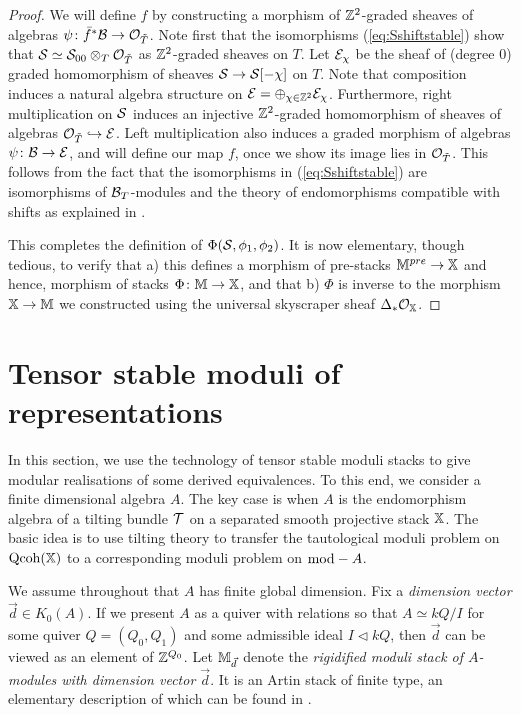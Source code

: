\documentclass[12pt]{amsart}
\begin{document}
\begin{proof}
We will define $f$ by constructing a morphism of $\mathbb{Z}^2$-graded sheaves of algebras $\psi \colon \bar{f}^* \mathcal{B} \to \mathcal{O}_{\tilde{T}}$. Note first that the isomorphisms (\ref{eq:Sshiftstable}) show that 
$\mathcal{S} \simeq \mathcal{S}_{00} \otimes_T \mathcal{O}_{\tilde{T}}$ as $\mathbb{Z}^2$-graded sheaves on $T$. Let $\mathcal{E}_{\chi}$ be the sheaf of (degree 0) graded homomorphism of sheaves $\mathcal{S} \to \mathcal{S}[-\chi]$ on $T$. Note that composition induces a natural algebra structure on $\mathcal{E} =  \oplus_{\chi \in \mathbb{Z}^2} \mathcal{E}_{\chi}$. Furthermore, right multiplication on $\mathcal{S}$ induces an injective  $\mathbb{Z}^2$-graded homomorphism of sheaves of algebras $\mathcal{O}_{\tilde{T}} \hookrightarrow \mathcal{E}$. Left multiplication also induces a graded morphism of algebras $\psi \colon \mathcal{B} \to \mathcal{E}$, and will define our map $f$, once we show its image lies in $\mathcal{O}_{\tilde{T}}$. This follows from the fact that the isomorphisms in (\ref{eq:Sshiftstable}) are isomorphisms of $\mathcal{B}_T$-modules and the theory of endomorphisms compatible with shifts as explained in \cite[Section~3]{C12}. 

This completes the definition of $\Phi(\mathcal{S}, \phi_1,\phi_2)$. It is now elementary, though tedious, to verify that a) this defines a morphism of pre-stacks $\mathbb{M}^{pre} \to \mathbb{X}$ and hence, morphism of stacks $\Phi \colon \mathbb{M} \to \mathbb{X}$, and that b) $\Phi$ is inverse to the morphism $\mathbb{X} \to \mathbb{M}$ we constructed using the universal skyscraper sheaf $\Delta_* \mathcal{O}_{\mathbb{X}}$. 
\end{proof}

\section{Tensor stable moduli of representations}\label{sc:tensor_stable}

In this section, we use the technology of tensor stable moduli stacks to give modular realisations of some derived equivalences. To this end, we consider a finite dimensional algebra $A$. The key case is when $A$ is the endomorphism algebra of a tilting bundle $\mathcal{T}$ on a separated smooth projective stack $\mathbb{X}$. The basic idea is to use tilting theory to transfer the tautological moduli problem on $\operatorname{Qcoh}(\mathbb{X})$ to a corresponding moduli problem on  $\textup{mod}-A$.

We assume throughout that $A$ has finite global dimension. Fix a {\em dimension vector} $\vec{d} \in K_0(A)$. If we present $A$ as a quiver with relations so that $A \simeq kQ/I$ for some quiver $Q = (Q_0,Q_1)$ and some admissible ideal $I\triangleleft kQ$, then $\vec{d}$ can be viewed as an element of $\mathbb{Z}^{Q_0}$. Let $\mathbb{M}_{\vec{d}}$ denote the {\em rigidified moduli stack of $A$-modules with dimension vector $\vec{d}$}. It is an Artin stack of finite type, an elementary description of which can be found in \cite[Section~2]{CL}.
\end{document}
